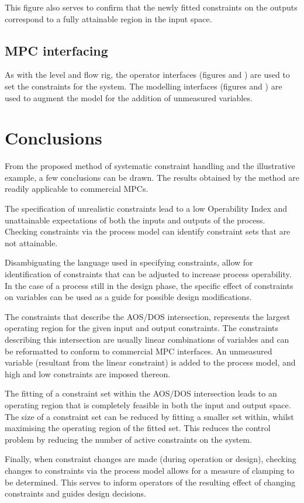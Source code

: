 \documentclass[final,authoryear,5pt,times,twocolumn]{elsarticle}
\begin{document}
This figure also serves to confirm that the newly fitted constraints on the outputs correspond to a fully attainable region in the input space.


\subsection{MPC interfacing}
As with the level and flow rig, the operator interfaces (figures and ) are used to set the constraints for the system.
The modelling interfaces (figures and ) are used to augment the model for the addition of unmeasured variables.


\section{Conclusions}\label{sec:conclusions}
From the proposed method of systematic constraint handling and the illustrative example, a few conclusions can be drawn.
The results obtained by the method are readily applicable to commercial MPCs.

The specification of unrealistic constraints lead to a low Operability Index and unattainable expectations of both the inputs and outputs of the process.
Checking constraints via the process model can identify constraint sets that are not attainable.

Disambiguating the language used in specifying constraints, allow for identification of constraints that can be adjusted to increase process operability.
In the case of a process still in the design phase, the specific effect of constraints on variables can be used as a guide for possible design modifications. 

The constraints that describe the AOS/DOS intersection, represents the largest operating region for the given input and output constraints.
The constraints describing this intersection are usually linear combinations of variables and can be reformatted to conform to commercial MPC interfaces.
An unmeasured variable (resultant from the linear constraint) is added to the process model, and high and low constraints are imposed thereon.

The fitting of a constraint set within the AOS/DOS intersection leads to an operating region that is completely feasible in both the input and output space.
The size of a constraint set can be reduced by fitting a smaller set within, whilst maximising the operating region of the fitted set.
This reduces the control problem by reducing the number of active constraints on the system.

Finally, when constraint changes are made (during operation or design), checking changes to constraints via the process model allows for a measure of clamping to be determined.
This serves to inform operators of the resulting effect of changing constraints and guides design decisions.




\end{document}
